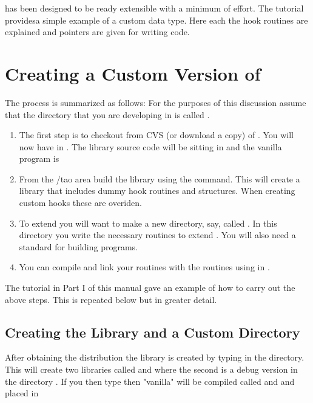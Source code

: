 
\tao has been designed to be ready extensible with a minimum of
effort. The tutorial providesa simple example of a custom data type. Here each
the hook routines are explained and pointers are given for writing code. 

\chapter{Creating a Custom Version of \tao}
\label{c:prog_intro} 

The process is summarized as follows: For the purposes of this
discussion assume that the directory that you are developing \tao in
is called . 
\begin{enumerate}
\item 
The first step is to checkout from CVS (or download a
copy) of \tao. You will now have \tao in
. The library source code will be sitting in 
and the vanilla \tao program is 
\item 
From the /tao area build the \tao library using the
 command. This will create a \tao library that includes dummy hook
routines and structures. When creating custom hooks these are overiden.
\item
To extend \tao you will want to make a new
directory, say, called . In this directory you write
the necessary routines to extend \tao. You will also need a standard 
 for building programs.
\item
You can compile and link your routines with the \tao routines using
 in .
\end{enumerate}

The tutorial in Part I of this manual gave an example of how to carry out the
above steps. This is repeated below but in greater detail.

\section{Creating the \tao Library and a Custom \tao Directory}
After obtaining the \tao distribution the \tao library is created by typing 
 in the  directory. This will create two libraries
called  and  where the second is a debug version
in the directory . If you then type  then
"vanilla" \tao will be compiled called  and  and placed in


